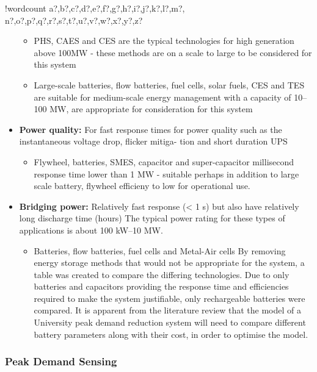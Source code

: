 \documentclass[10pt]{article}
\providecommand{\tightlist}{%
  \setlength{\itemsep}{0pt}\setlength{\parskip}{0pt}}
\newcounter{words}
\newenvironment{counted}{%
  \setcounter{words}{0}
  \SearchList!{wordcount}{\stepcounter{words}}
    {a?,b?,c?,d?,e?,f?,g?,h?,i?,j?,k?,l?,m?,
    n?,o?,p?,q?,r?,s?,t?,u?,v?,w?,x?,y?,z?}
  \UndoBoundary{'}
  \SearchOrder{p;}}{%
  \StopSearching}
\begin{document}
\begin{counted}
\begin{itemize}
  \begin{itemize}
  \tightlist
  \item
    PHS, CAES and CES are the typical technologies for high generation
    above 100MW - these methods are on a scale to large to be considered
    for this system
  \item
    Large-scale batteries, flow batteries, fuel cells, solar fuels, CES
    and TES are suitable for medium-scale energy management with a
    capacity of 10--100 MW, are appropriate for consideration for this
    system
  \end{itemize}
\item
  \textbf{Power quality:} For fast response times for power quality such
  as the instantaneous voltage drop, flicker mitiga- tion and short
  duration UPS

  \begin{itemize}
  \tightlist
  \item
    Flywheel, batteries, SMES, capacitor and super-capacitor millisecond
    response time lower than 1 MW - suitable perhaps in addition to
    large scale battery, flywheel efficieny to low for operational use.
  \end{itemize}
\item
  \textbf{Bridging power:} Relatively fast response (\textless{} 1 s)
  but also have relatively long discharge time (hours) The typical power
  rating for these types of applications is about 100 kW--10 MW.

  \begin{itemize}
  \tightlist
  \item
    Batteries, flow batteries, fuel cells and Metal-Air cells
    \cite{Chen2009291} By removing energy storage methods that would not
    be appropriate for the system, a table was created to compare the
    differing technologies. Due to only batteries and capacitors
    providing the response time and efficiencies required to make the
    system justifiable, only rechargeable batteries were compared. It is
    apparent from the literature review that the model of a University
    peak demand reduction system will need to compare different battery
    parameters along with their cost, in order to optimise the model.
  \end{itemize}
\end{itemize}

\subsubsection{Peak Demand Sensing}\label{peak-demand-sensing}


\end{counted}
\end{document}
